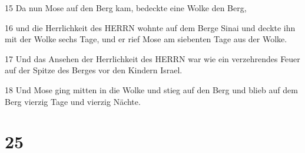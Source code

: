 \par 15 Da nun Mose auf den Berg kam, bedeckte eine Wolke den Berg,
\par 16 und die Herrlichkeit des HERRN wohnte auf dem Berge Sinai und deckte ihn mit der Wolke sechs Tage, und er rief Mose am siebenten Tage aus der Wolke.
\par 17 Und das Ansehen der Herrlichkeit des HERRN war wie ein verzehrendes Feuer auf der Spitze des Berges vor den Kindern Israel.
\par 18 Und Mose ging mitten in die Wolke und stieg auf den Berg und blieb auf dem Berg vierzig Tage und vierzig Nächte.

\chapter{25}

